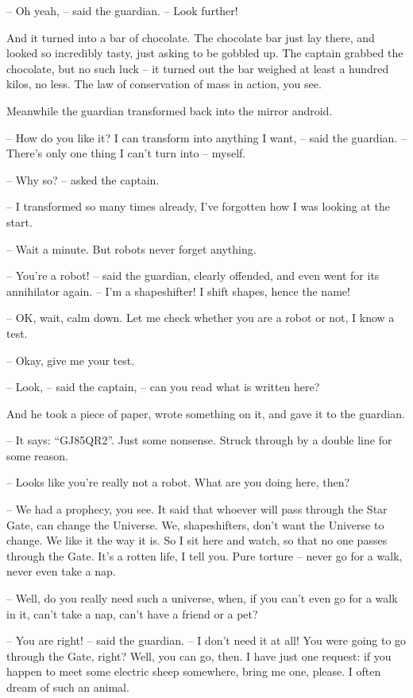 \documentclass[ebook,twoside,final,openright]{memoir}
\begin{document}
– Oh yeah, – said the guardian. – Look further!\par
\par
And it turned into a bar of chocolate. The chocolate bar just lay there, and looked so incredibly tasty, just asking to be gobbled up. The captain grabbed the chocolate, but no such luck – it turned out the bar weighed at least a hundred kilos, no less. The law of conservation of mass in action, you see.\par
\par
Meanwhile the guardian transformed back into the mirror android.\par
– How do you like it? I can transform into anything I want, – said the guardian. – There’s only one thing I can’t turn into – myself.\par
– Why so? – asked the captain.\par
– I transformed so many times already, I’ve forgotten how I was looking at the start.\par
– Wait a minute. But robots never forget anything.\par
– You’re a robot! – said the guardian, clearly offended, and even went for its annihilator again. – I’m a shapeshifter! I shift shapes, hence the name!\par
– OK, wait, calm down. Let me check whether you are a robot or not, I know a test.\par
– Okay, give me your test.\par
– Look, – said the captain, – can you read what is written here?\par
And he took a piece of paper, wrote something on it, and gave it to the guardian.\par
– It says: “GJ85QR2”. Just some nonsense. Struck through by a double line for some reason.\par
– Looks like you're really not a robot. What are you doing here, then?\par
– We had a prophecy, you see. It said that whoever will pass through the Star Gate, can change the Universe. We, shapeshifters, don’t want the Universe to change. We like it the way it is. So I sit here and watch, so that no one passes through the Gate. It’s a rotten life, I tell you. Pure torture – never go for a walk, never even take a nap.\par
– Well, do you really need such a universe, when, if you can’t even go for a walk in it, can’t take a nap, can’t have a friend or a pet?\par
– You are right! – said the guardian. – I don’t need it at all! You were going to go through the Gate, right? Well, you can go, then. I have just one request: if you happen to meet some electric sheep somewhere, bring me one, please. I often dream of such an animal.\par
\end{document}
